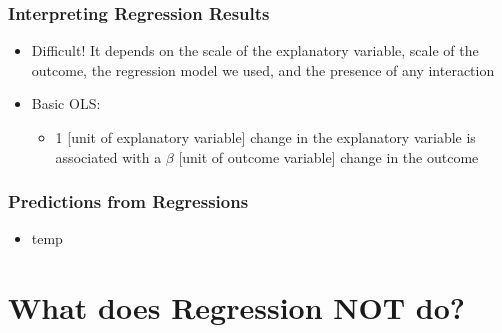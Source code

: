\documentclass[xcolor=x11names,compress]{beamer}\usepackage[]{graphicx}\usepackage[]{color}
\makeatletter
\newcommand{\hlstr}[1]{\textcolor[rgb]{0.192,0.494,0.8}{#1}}%
\newcommand{\hlopt}[1]{\textcolor[rgb]{0,0,0}{#1}}%
\newcommand{\hlstd}[1]{\textcolor[rgb]{0.345,0.345,0.345}{#1}}%
\newcommand{\hlkwc}[1]{\textcolor[rgb]{0.333,0.667,0.333}{#1}}%
\newcommand{\hlkwd}[1]{\textcolor[rgb]{0.737,0.353,0.396}{\textbf{#1}}}%
\newenvironment{kframe}{%
 \def\at@end@of@kframe{}%
 \ifinner\ifhmode%
  \def\at@end@of@kframe{\end{minipage}}%
  \begin{minipage}{\columnwidth}%
 \fi\fi%
 \def\FrameCommand##1{\hskip\@totalleftmargin \hskip-\fboxsep
 \colorbox{shadecolor}{##1}\hskip-\fboxsep
     \hskip-\linewidth \hskip-\@totalleftmargin \hskip\columnwidth}%
 \MakeFramed {\advance\hsize-\width
   \@totalleftmargin\z@ \linewidth\hsize
   \@setminipage}}%
 {\par\unskip\endMakeFramed%
 \at@end@of@kframe}
\newenvironment{knitrout}{}{} %
\renewcommand{\(}{\begin{columns}}
\renewcommand{\)}{\end{columns}}
\newcommand{\<}[1]{\begin{column}{#1}}
\renewcommand{\>}{\end{column}}
\makeatother
\begin{document}

\begin{frame}
\frametitle{Interpreting Regression Results}
\begin{itemize}
\item Difficult! It depends on the scale of the explanatory variable, scale of the outcome, the regression model we used, and the presence of any interaction
\item Basic OLS:
\begin{itemize}
\item 1 [unit of explanatory variable] change in the explanatory variable is associated with a $\beta$ [unit of outcome variable] change in the outcome
\end{itemize}
\end{itemize}
\end{frame}

\begin{frame}
\frametitle{Predictions from Regressions}
\begin{itemize}
\item temp
\end{itemize}
\end{frame}


\section{What does Regression NOT do?}

\end{document}
